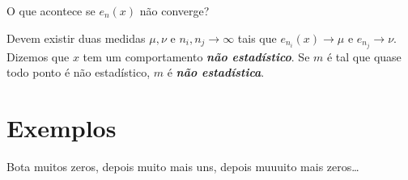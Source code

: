 \begin{question}\leavevmode
	O que acontece se $e_n(x) $ não converge?
\end{question}
Devem existir duas medidas $\mu,\nu$ e $n_i,n_j\to\infty$ tais que $e_{n_i}(x)\to \mu$ e $e_{n_j}\to \nu$. Dizemos que $x$ tem um comportamento \textit{\textbf{não estadístico}}. Se $m$  é tal que quase todo ponto é não estadístico, $m$ é \textit{\textbf{não estadística}}.

\section{Exemplos}

Bota muitos zeros, depois muito mais uns, depois muuuito mais zeros…




